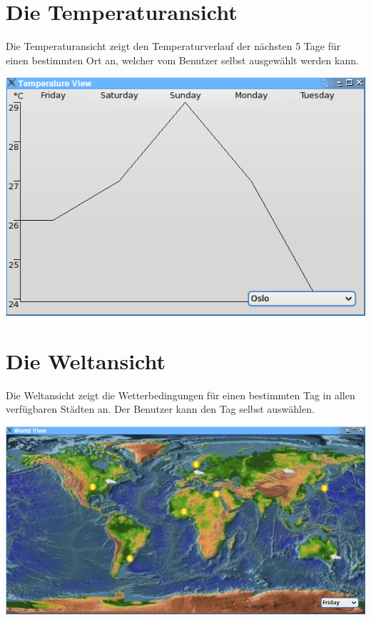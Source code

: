 \documentclass[a4paper]{scrreprt}
\begin{document}
\section{Die Temperaturansicht}
Die Temperaturansicht zeigt den Temperaturverlauf der n\"achsten 5 Tage
f\"ur einen bestimmten Ort an, welcher vom Benutzer selbst ausgew\"ahlt
werden kann.

\begin{center}
\includegraphics[width=14cm]{temperatureview.png}
\end{center}

\section{Die Weltansicht}
Die Weltansicht zeigt die Wetterbedingungen f\"ur einen bestimmten Tag
in allen verf\"ugbaren St\"adten an. Der Benutzer kann den Tag selbst
ausw\"ahlen.

\begin{center}
\includegraphics[width=14cm]{worldview.png}
\end{center}
\end{document}
